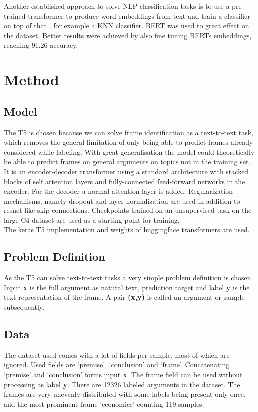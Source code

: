 \documentclass[11pt,a4paper,onecolumn,oneside,notitlepage]{article}
\begin{document}
Another established approach to solve  NLP classification tasks is to use a pre-trained transformer to produce word embeddings from text and train a classifier on top of that , for example a KNN classifier. BERT was used\citep{bert_frame_ident} to great effect on the \citep{bert_dataset} dataset. Better results were achieved by also fine tuning BERTs embeddings, reaching \num{91.26} accuracy.  


\section{Method}
\label{method}

\subsection{Model}
The T5 is chosen because we can solve frame identification as a text-to-text task, which removes the general limitation of only being able to predict frames already considered while labeling. With great generalisation the model could theoretically be able to predict frames on general arguments on topics not in the training set. It is an encoder-decoder transformer using a standard architecture with stacked blocks of  self attention layers and fully-connected feed-forward networks in the encoder. For the decoder a normal attention layer is added. Regularization mechanisms, namely dropout and layer normalization are used in addition to resnet-like skip-connections.\citep{T5} Checkpoints trained on an unsupervised task on the large C4 dataset are used as a starting point for training.\\

The keras\citep{keras} T5 implementation and weights of huggingface transformers \citep{wolf-etal-2020-transformers} are used.


\subsection{Problem Definition}

As the T5 can solve text-to-text tasks a very simple problem definition is chosen. Input \textbf{x} is the full argument as natural text, prediction target and label \textbf{y} is the text representation of the frame. A pair \textbf{(x,y)} is called an argument or sample subsequently. 
\subsection{Data}
\label{subsec:data}
The dataset used \citep{webis_task_paper}  comes with a lot of fields per sample, most of which are ignored. Used fields are ‘premise’, ‘conclusion’ and ‘frame’. Concatenating ‘premise’ and ‘conclusion’ forms input \textbf{x}. The frame field can be used without processing as label \textbf{y}. There are \num{12326} labeled arguments in the dataset. The frames are very unevenly distributed with some labels being present only once, and the most prominent frame 'economics' counting 119 samples.
\end{document}
